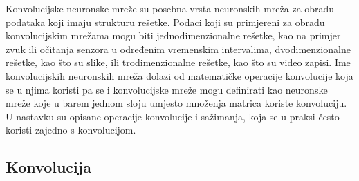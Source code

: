 \nocite{Goodfellow-et-al-2016}

Konvolucijske neuronske mreže su posebna vrsta neuronskih mreža za obradu podataka koji imaju strukturu rešetke. Podaci koji su primjereni za obradu konvolucijskim mrežama mogu biti jednodimenzionalne rešetke, kao na primjer zvuk ili očitanja senzora u određenim vremenskim intervalima, dvodimenzionalne rešetke, kao što su slike, ili trodimenzionalne rešetke, kao što su video zapisi.
Ime konvolucijskih neuronskih mreža dolazi od matematičke operacije konvolucije koja se u njima koristi pa se i konvolucijske mreže mogu definirati kao neuronske mreže koje u barem jednom sloju umjesto množenja matrica koriste konvoluciju.
U nastavku su opisane operacije konvolucije i sažimanja, koja se u praksi često koristi zajedno s konvolucijom.

\subsection{Konvolucija}
